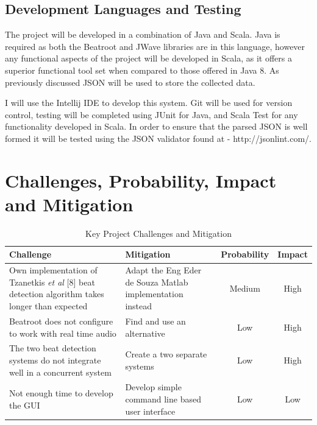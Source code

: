 \documentclass[a4paper, 11pt]{article}
\begin{document}
\subsection{Development Languages and Testing}
The project will be developed in a combination of Java and Scala. Java is required as both the Beatroot and JWave libraries are in this language, however any functional aspects of the project will be developed in Scala, as it offers a superior functional tool set when compared to those offered in Java 8. As previously discussed JSON will be used to store the collected data.

I will use the Intellij IDE to develop this system. Git will be used for version control, testing will be completed using JUnit for Java, and Scala Test for any functionality developed in Scala. In order to ensure that the parsed JSON is well formed it will be tested using the JSON validator found at - http://jsonlint.com/.

\section{Challenges, Probability, Impact and Mitigation}
\begin{table}[h]
\caption{Key Project Challenges and Mitigation} 
\centering
\begin{tabular}{|p{6cm}|p{6cm}|c|c|}
 \hline
\textbf{Challenge} & \textbf{Mitigation} & \textbf{Probability} & \textbf{Impact}\\ [0.5ex]
\hline 
Own implementation of Tzanetkis \textit{et al} [8] beat detection algorithm takes longer than expected & Adapt the Eng Eder de Souza Matlab implementation instead & Medium & High\\
\hline
Beatroot does not configure to work with real time audio & Find and use an alternative & Low & High\\ 
\hline
The two beat detection systems do not integrate well in a concurrent system & Create a two separate systems & Low & High\\
\hline
Not enough time to develop the GUI & Develop simple command line based user interface & Low & Low\\
\hline
\end{tabular}
\end{table}

\clearpage
\maketitle{} 
\end{document}
